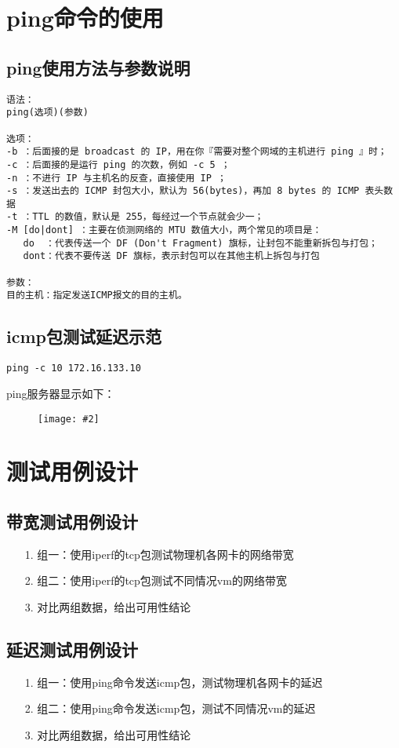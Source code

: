 \documentclass[a4paper,left=1.5cm,right=1.5cm,11pt]{article}
\newcommand{\sizedfic}[2]{\begin{figure}[H]
		\center
		\texttt{[image: \#2]}
	\end{figure}}
\begin{document}
\section{ping命令的使用}
\subsection{ping使用方法与参数说明}
\begin{lstlisting}
语法：
ping(选项)(参数)

选项：
-b ：后面接的是 broadcast 的 IP，用在你『需要对整个网域的主机进行 ping 』时；
-c ：后面接的是运行 ping 的次数，例如 -c 5 ；
-n ：不进行 IP 与主机名的反查，直接使用 IP ；
-s ：发送出去的 ICMP 封包大小，默认为 56(bytes)，再加 8 bytes 的 ICMP 表头数据
-t ：TTL 的数值，默认是 255，每经过一个节点就会少一；
-M [do|dont] ：主要在侦测网络的 MTU 数值大小，两个常见的项目是：
   do  ：代表传送一个 DF (Don't Fragment) 旗标，让封包不能重新拆包与打包；
   dont：代表不要传送 DF 旗标，表示封包可以在其他主机上拆包与打包

参数：
目的主机：指定发送ICMP报文的目的主机。
\end{lstlisting}
\subsection{icmp包测试延迟示范}
\begin{lstlisting}
ping -c 10 172.16.133.10
\end{lstlisting}
ping服务器显示如下：
\sizedfic{0.8}{ping1.png}
\section{测试用例设计}
\subsection{带宽测试用例设计}
\begin{itemize}
	\item[1.]组一：使用iperf的tcp包测试物理机各网卡的网络带宽
	\item[2.]组二：使用iperf的tcp包测试不同情况vm的网络带宽
	\item[3.]对比两组数据，给出可用性结论
\end{itemize}
\subsection{延迟测试用例设计}
\begin{itemize}
	\item[1.]组一：使用ping命令发送icmp包，测试物理机各网卡的延迟
	\item[2.]组二：使用ping命令发送icmp包，测试不同情况vm的延迟
	\item[3.]对比两组数据，给出可用性结论
\end{itemize}
\end{document}
